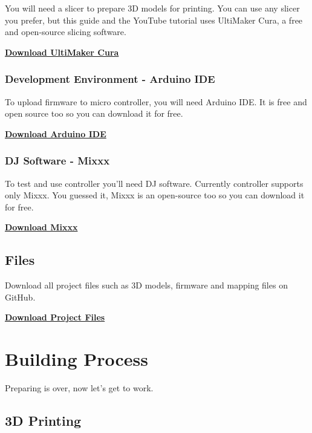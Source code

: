 \documentclass[12pt, a4paper]{article}
\begin{document}
				\noindent You will need a slicer to prepare 3D models for printing. You can use any slicer you prefer, but this guide and the YouTube tutorial uses UltiMaker Cura, a free and open-source slicing software.
				
				\noindent\href{https://ultimaker.com/software/ultimaker-cura/}{\textbf{Download UltiMaker Cura}}
			
			\subsubsection{Development Environment - Arduino IDE}
				
				\noindent To upload firmware to micro controller, you will need Arduino IDE. It is free and open source too so you can download it for free.
				
			\noindent\href{https://www.arduino.cc/en/software/}{\textbf{Download Arduino IDE}}
					
			\subsubsection{DJ Software - Mixxx}
			
				\noindent To test and use controller you'll need DJ software. Currently controller supports only Mixxx. You guessed it, Mixxx is an open-source too so you can download it for free.
				
				\noindent\href{https://mixxx.org/download/}{\textbf{Download Mixxx}}
		
		\subsection{Files}
			
			\noindent Download all project files such as 3D models, firmware and mapping files on GitHub.
				
			\noindent\href{https://github.com/mandiclab/djc-diy}{\textbf{Download Project Files}}
				
			\newpage

	\section{Building Process}
		
		\noindent Preparing is over, now let's get to work.
	
		\subsection{3D Printing}
			
\end{document}
